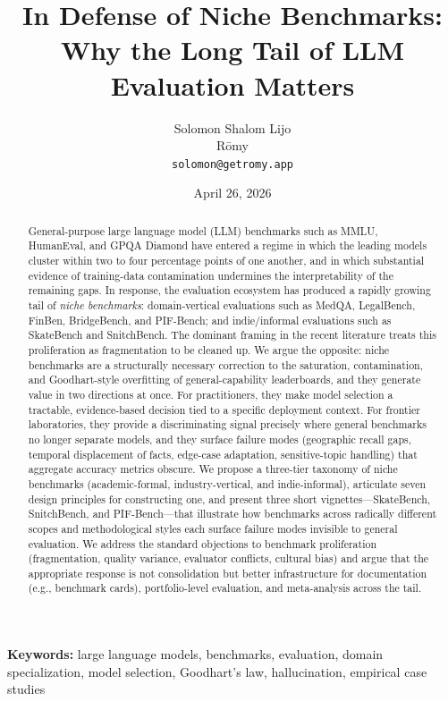 \documentclass[11pt,a4paper]{article}
\title{%
  \textbf{In Defense of Niche Benchmarks:\\
  Why the Long Tail of LLM Evaluation Matters}%
}
\author{
  Solomon Shalom Lijo \\
  R\={o}my \\
  \texttt{solomon@getromy.app}
}
\date{April 26, 2026}
\begin{document}
\maketitle

\begin{abstract}
General-purpose large language model (LLM) benchmarks such as MMLU, HumanEval, and GPQA Diamond have entered a regime in which the leading models cluster within two to four percentage points of one another, and in which substantial evidence of training-data contamination undermines the interpretability of the remaining gaps. In response, the evaluation ecosystem has produced a rapidly growing tail of \emph{niche benchmarks}: domain-vertical evaluations such as MedQA, LegalBench, FinBen, BridgeBench, and PIF-Bench; and indie/informal evaluations such as SkateBench and SnitchBench. The dominant framing in the recent literature treats this proliferation as fragmentation to be cleaned up. We argue the opposite: niche benchmarks are a structurally necessary correction to the saturation, contamination, and Goodhart-style overfitting of general-capability leaderboards, and they generate value in two directions at once. For practitioners, they make model selection a tractable, evidence-based decision tied to a specific deployment context. For frontier laboratories, they provide a discriminating signal precisely where general benchmarks no longer separate models, and they surface failure modes (geographic recall gaps, temporal displacement of facts, edge-case adaptation, sensitive-topic handling) that aggregate accuracy metrics obscure. We propose a three-tier taxonomy of niche benchmarks (academic-formal, industry-vertical, and indie-informal), articulate seven design principles for constructing one, and present three short vignettes---SkateBench, SnitchBench, and PIF-Bench---that illustrate how benchmarks across radically different scopes and methodological styles each surface failure modes invisible to general evaluation. We address the standard objections to benchmark proliferation (fragmentation, quality variance, evaluator conflicts, cultural bias) and argue that the appropriate response is not consolidation but better infrastructure for documentation (e.g., benchmark cards), portfolio-level evaluation, and meta-analysis across the tail.
\end{abstract}

\medskip
\noindent\textbf{Keywords:} large language models, benchmarks, evaluation, domain specialization, model selection, Goodhart's law, hallucination, empirical case studies
\end{document}
